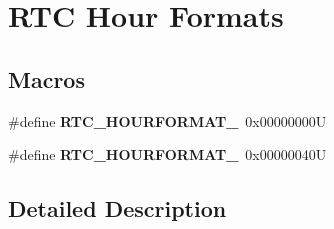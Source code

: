 \hypertarget{group___r_t_c___hour___formats}{}\section{R\+TC Hour Formats}
\label{group___r_t_c___hour___formats}
\subsection*{Macros}
\begin{DoxyCompactItemize}
\item 
\mbox{\label{group___r_t_c___hour___formats_gab1a861fd858a55a6e815be4585c413d5}} 
\#define {\bfseries R\+T\+C\+\_\+\+H\+O\+U\+R\+F\+O\+R\+M\+A\+T\+\_}~0x00000000U
\item 
\mbox{\label{group___r_t_c___hour___formats_ga8da8ecb55e286c410dbf1297a81125ae}} 
\#define {\bfseries R\+T\+C\+\_\+\+H\+O\+U\+R\+F\+O\+R\+M\+A\+T\+\_}~0x00000040U
\end{DoxyCompactItemize}


\subsection{Detailed Description}
